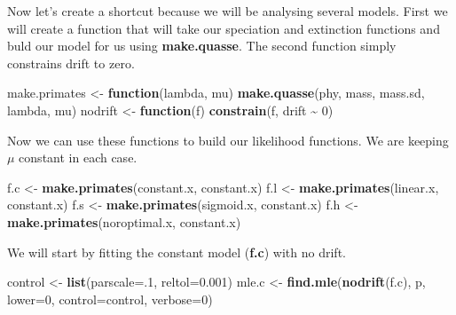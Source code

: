 \documentclass[
]{book}
\newenvironment{Shaded}{\begin{snugshade}}{\end{snugshade}}
\newcommand{\ControlFlowTok}[1]{\textcolor[rgb]{0.13,0.29,0.53}{\textbf{#1}}}
\newcommand{\DataTypeTok}[1]{\textcolor[rgb]{0.13,0.29,0.53}{#1}}
\newcommand{\DecValTok}[1]{\textcolor[rgb]{0.00,0.00,0.81}{#1}}
\newcommand{\FloatTok}[1]{\textcolor[rgb]{0.00,0.00,0.81}{#1}}
\newcommand{\KeywordTok}[1]{\textcolor[rgb]{0.13,0.29,0.53}{\textbf{#1}}}
\newcommand{\NormalTok}[1]{#1}
\newcommand{\OperatorTok}[1]{\textcolor[rgb]{0.81,0.36,0.00}{\textbf{#1}}}
\newcommand{\StringTok}[1]{\textcolor[rgb]{0.31,0.60,0.02}{#1}}
\begin{document}
Now let's create a shortcut because we will be analysing several models. First we will create a function that will take our speciation and extinction functions and buld our model for us using \textbf{make.quasse}. The second function simply constrains drift to zero.

\begin{Shaded}
\begin{Highlighting}[]
\NormalTok{make.primates \textless{}{-}}\StringTok{ }\ControlFlowTok{function}\NormalTok{(lambda, mu) }
  \KeywordTok{make.quasse}\NormalTok{(phy, mass, mass.sd, lambda, mu)}
\NormalTok{nodrift \textless{}{-}}\StringTok{ }\ControlFlowTok{function}\NormalTok{(f)}
  \KeywordTok{constrain}\NormalTok{(f, drift }\OperatorTok{\textasciitilde{}}\StringTok{ }\DecValTok{0}\NormalTok{)}
\end{Highlighting}
\end{Shaded}

Now we can use these functions to build our likelihood functions. We are keeping \(\mu\) constant in each case.

\begin{Shaded}
\begin{Highlighting}[]
\NormalTok{f.c \textless{}{-}}\StringTok{ }\KeywordTok{make.primates}\NormalTok{(constant.x, constant.x)}
\NormalTok{f.l \textless{}{-}}\StringTok{ }\KeywordTok{make.primates}\NormalTok{(linear.x, constant.x)}
\NormalTok{f.s \textless{}{-}}\StringTok{ }\KeywordTok{make.primates}\NormalTok{(sigmoid.x, constant.x)}
\NormalTok{f.h \textless{}{-}}\StringTok{ }\KeywordTok{make.primates}\NormalTok{(noroptimal.x, constant.x)}
\end{Highlighting}
\end{Shaded}

We will start by fitting the constant model (\textbf{f.c}) with no drift.

\begin{Shaded}
\begin{Highlighting}[]
\NormalTok{control \textless{}{-}}\StringTok{ }\KeywordTok{list}\NormalTok{(}\DataTypeTok{parscale=}\NormalTok{.}\DecValTok{1}\NormalTok{, }\DataTypeTok{reltol=}\FloatTok{0.001}\NormalTok{)}
\NormalTok{mle.c \textless{}{-}}\StringTok{ }\KeywordTok{find.mle}\NormalTok{(}\KeywordTok{nodrift}\NormalTok{(f.c), p, }\DataTypeTok{lower=}\DecValTok{0}\NormalTok{, }\DataTypeTok{control=}\NormalTok{control, }\DataTypeTok{verbose=}\DecValTok{0}\NormalTok{)}
\end{Highlighting}
\end{Shaded}
\end{document}

